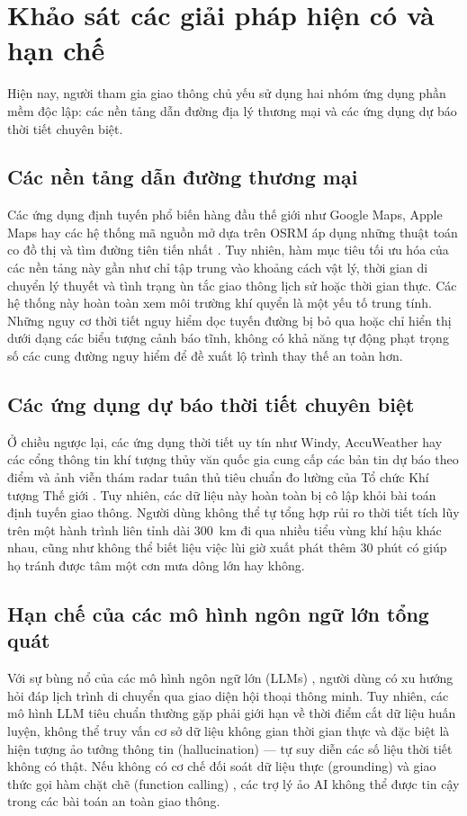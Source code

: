 \section{Khảo sát các giải pháp hiện có và hạn chế}
Hiện nay, người tham gia giao thông chủ yếu sử dụng hai nhóm ứng dụng phần mềm độc lập: các nền tảng dẫn đường địa lý thương mại và các ứng dụng dự báo thời tiết chuyên biệt.

\subsection{Các nền tảng dẫn đường thương mại}
Các ứng dụng định tuyến phổ biến hàng đầu thế giới như Google Maps, Apple Maps hay các hệ thống mã nguồn mở dựa trên OSRM \cite{luxen2011real} áp dụng những thuật toán co đồ thị và tìm đường tiên tiến nhất \cite{dijkstra1959note, bast2016route, geisberger2008contraction}. Tuy nhiên, hàm mục tiêu tối ưu hóa của các nền tảng này gần như chỉ tập trung vào khoảng cách vật lý, thời gian di chuyển lý thuyết và tình trạng ùn tắc giao thông lịch sử hoặc thời gian thực. Các hệ thống này hoàn toàn xem môi trường khí quyển là một yếu tố trung tính. Những nguy cơ thời tiết nguy hiểm dọc tuyến đường bị bỏ qua hoặc chỉ hiển thị dưới dạng các biểu tượng cảnh báo tĩnh, không có khả năng tự động phạt trọng số các cung đường nguy hiểm để đề xuất lộ trình thay thế an toàn hơn.

\subsection{Các ứng dụng dự báo thời tiết chuyên biệt}
Ở chiều ngược lại, các ứng dụng thời tiết uy tín như Windy, AccuWeather hay các cổng thông tin khí tượng thủy văn quốc gia cung cấp các bản tin dự báo theo điểm và ảnh viễn thám radar tuân thủ tiêu chuẩn đo lường của Tổ chức Khí tượng Thế giới \cite{wmo2021guidelines}. Tuy nhiên, các dữ liệu này hoàn toàn bị cô lập khỏi bài toán định tuyến giao thông. Người dùng không thể tự tổng hợp rủi ro thời tiết tích lũy trên một hành trình liên tỉnh dài 300~km đi qua nhiều tiểu vùng khí hậu khác nhau, cũng như không thể biết liệu việc lùi giờ xuất phát thêm 30 phút có giúp họ tránh được tâm một cơn mưa dông lớn hay không.

\subsection{Hạn chế của các mô hình ngôn ngữ lớn tổng quát}
Với sự bùng nổ của các mô hình ngôn ngữ lớn (LLMs) \cite{vaswani2017attention, gemini2024flash}, người dùng có xu hướng hỏi đáp lịch trình di chuyển qua giao diện hội thoại thông minh. Tuy nhiên, các mô hình LLM tiêu chuẩn thường gặp phải giới hạn về thời điểm cắt dữ liệu huấn luyện, không thể truy vấn cơ sở dữ liệu không gian thời gian thực và đặc biệt là hiện tượng ảo tưởng thông tin (hallucination) --- tự suy diễn các số liệu thời tiết không có thật. Nếu không có cơ chế đối soát dữ liệu thực (grounding) và giao thức gọi hàm chặt chẽ (function calling) \cite{lewis2020retrieval}, các trợ lý ảo AI không thể được tin cậy trong các bài toán an toàn giao thông.

